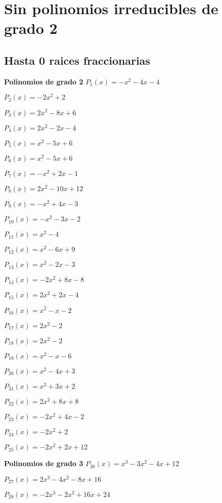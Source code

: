 \section{Sin polinomios irreducibles de grado 2}
\subsection{Hasta 0 raices fraccionarias}
\textbf{Polinomios de grado 2} 
\subitem $P_{1}(x) = -x^2 - 4x - 4$

\subitem $P_{2}(x) = -2x^2 + 2$

\subitem $P_{3}(x) = 2x^2 - 8x + 6$

\subitem $P_{4}(x) = 2x^2 - 2x - 4$

\subitem $P_{5}(x) = x^2 - 5x + 6$

\subitem $P_{6}(x) = x^2 - 5x + 6$

\subitem $P_{7}(x) = -x^2 + 2x - 1$

\subitem $P_{8}(x) = 2x^2 - 10x + 12$

\subitem $P_{9}(x) = -x^2 + 4x - 3$

\subitem $P_{10}(x) = -x^2 - 3x - 2$

\subitem $P_{11}(x) = x^2 - 4$

\subitem $P_{12}(x) = x^2 - 6x + 9$

\subitem $P_{13}(x) = x^2 - 2x - 3$

\subitem $P_{14}(x) = -2x^2 + 8x - 8$

\subitem $P_{15}(x) = 2x^2 + 2x - 4$

\subitem $P_{16}(x) = x^2 - x - 2$

\subitem $P_{17}(x) = 2x^2 - 2$

\subitem $P_{18}(x) = 2x^2 - 2$

\subitem $P_{19}(x) = x^2 - x - 6$

\subitem $P_{20}(x) = x^2 - 4x + 3$

\subitem $P_{21}(x) = x^2 + 3x + 2$

\subitem $P_{22}(x) = 2x^2 + 8x + 8$

\subitem $P_{23}(x) = -2x^2 + 4x - 2$

\subitem $P_{24}(x) = -2x^2 + 2$

\subitem $P_{25}(x) = -2x^2 + 2x + 12$

\textbf{Polinomios de grado 3} 
\subitem $P_{26}(x) = x^3 - 3x^2 - 4x + 12$

\subitem $P_{27}(x) = 2x^3 - 4x^2 - 8x + 16$

\subitem $P_{28}(x) = -2x^3 - 2x^2 + 16x + 24$

